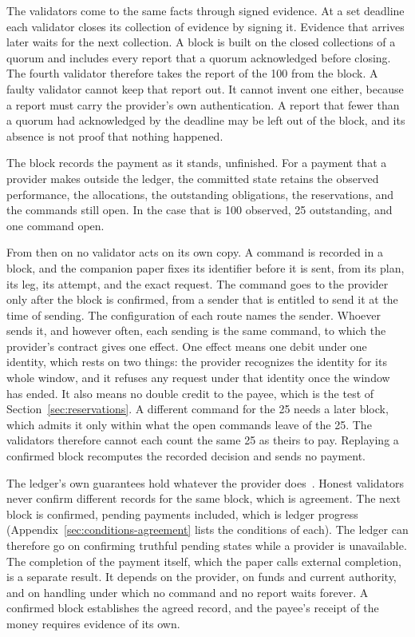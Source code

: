 \documentclass{momentum}
\begin{document}
The validators come to the same facts through signed evidence. At a set deadline each validator closes its collection of evidence by signing it. Evidence that arrives later waits for the next collection. A block is built on the closed collections of a quorum and includes every report that a quorum acknowledged before closing. The fourth validator therefore takes the report of the 100 from the block. A faulty validator cannot keep that report out. It cannot invent one either, because a report must carry the provider's own authentication. A report that fewer than a quorum had acknowledged by the deadline may be left out of the block, and its absence is not proof that nothing happened.

The block records the payment as it stands, unfinished. For a payment that a provider makes outside the ledger, the committed state retains the observed performance, the allocations, the outstanding obligations, the reservations, and the commands still open. In the case that is 100 observed, 25 outstanding, and one command open.

From then on no validator acts on its own copy. A command is recorded in a block, and the companion paper fixes its identifier before it is sent, from its plan, its leg, its attempt, and the exact request. The command goes to the provider only after the block is confirmed, from a sender that is entitled to send it at the time of sending. The configuration of each route names the sender. Whoever sends it, and however often, each sending is the same command, to which the provider's contract gives one effect. One effect means one debit under one identity, which rests on two things: the provider recognizes the identity for its whole window, and it refuses any request under that identity once the window has ended. It also means no double credit to the payee, which is the test of Section~\ref{sec:reservations}. A different command for the 25 needs a later block, which admits it only within what the open commands leave of the 25. The validators therefore cannot each count the same 25 as theirs to pay. Replaying a confirmed block recomputes the recorded decision and sends no payment.

The ledger's own guarantees hold whatever the provider does~\cite[Sections~3--7 and~9]{event}. Honest validators never confirm different records for the same block, which is agreement. The next block is confirmed, pending payments included, which is ledger progress (Appendix~\ref{sec:conditions-agreement} lists the conditions of each). The ledger can therefore go on confirming truthful pending states while a provider is unavailable. The completion of the payment itself, which the paper calls external completion, is a separate result. It depends on the provider, on funds and current authority, and on handling under which no command and no report waits forever. A confirmed block establishes the agreed record, and the payee's receipt of the money requires evidence of its own.
\end{document}
